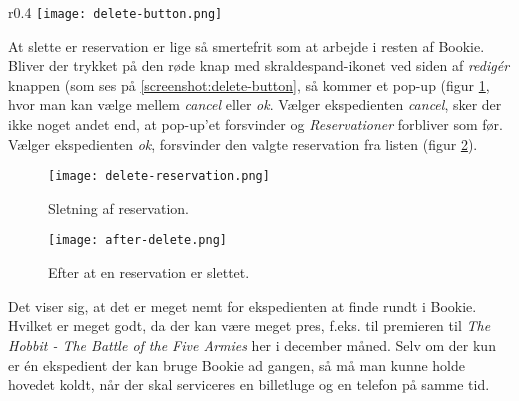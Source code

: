 \begin{wrapfigure}{r}{0.4\textwidth}
  \centering
  \texttt{[image: delete-button.png]}
  \caption{Mulighed for at slette den enkelte reservation.}
  \label{screenshot:delete-button}
\end{wrapfigure}

At slette er reservation er lige så smertefrit som at arbejde i resten af Bookie. Bliver der trykket på den røde knap med skraldespand-ikonet ved siden af \textit{redigér} knappen (som ses på \ref{screenshot:delete-button}, så kommer et pop-up (figur \ref{screenshot:delete-reservation}, hvor man kan vælge mellem \textit{cancel} eller \textit{ok}. Vælger ekspedienten \textit{cancel}, sker der ikke noget andet end, at pop-up'et forsvinder og \textit{Reservationer} forbliver som før. Vælger ekspedienten \textit{ok}, forsvinder den valgte reservation fra listen (figur \ref{screenshot:after-delete}).

\begin{figure} [h]
  \centering
  \texttt{[image: delete-reservation.png]}
  \caption{Sletning af reservation.}
  \label{screenshot:delete-reservation}
\end{figure}

\begin{figure}[h]
  \centering
  \texttt{[image: after-delete.png]}
  \caption{Efter at en reservation er slettet.}
  \label{screenshot:after-delete}
\end{figure}

Det viser sig, at det er meget nemt for ekspedienten at finde rundt i Bookie. Hvilket er meget godt, da der kan være meget pres, f.eks. til premieren til \textit{The Hobbit - The Battle of the Five Armies} her i december måned. Selv om der kun er én ekspedient der kan bruge Bookie ad gangen, så må man kunne holde hovedet koldt, når der skal serviceres en billetluge og en telefon på samme tid.